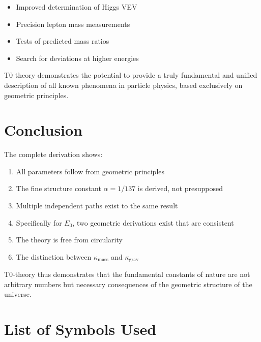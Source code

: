 \documentclass[12pt,a4paper]{article}
\begin{document}
\begin{itemize}
	\item Improved determination of Higgs VEV
	\item Precision lepton mass measurements
	\item Tests of predicted mass ratios
	\item Search for deviations at higher energies
\end{itemize}

T0 theory demonstrates the potential to provide a truly fundamental and unified description of all known phenomena in particle physics, based exclusively on geometric principles.
	\section{Conclusion}
	
	The complete derivation shows:
	\begin{enumerate}
		\item All parameters follow from geometric principles
		\item The fine structure constant $\alpha = 1/137$ is derived, not presupposed
		\item Multiple independent paths exist to the same result
		\item Specifically for $E_0$, two geometric derivations exist that are consistent
		\item The theory is free from circularity
		\item The distinction between $\kappa_{\text{mass}}$ and $\kappa_{\text{grav}}$
	\end{enumerate}
	
	T0-theory thus demonstrates that the fundamental constants of nature are not arbitrary numbers but necessary consequences of the geometric structure of the universe.


\section{List of Symbols Used}
\label{app:symbols_en}
\end{document}
